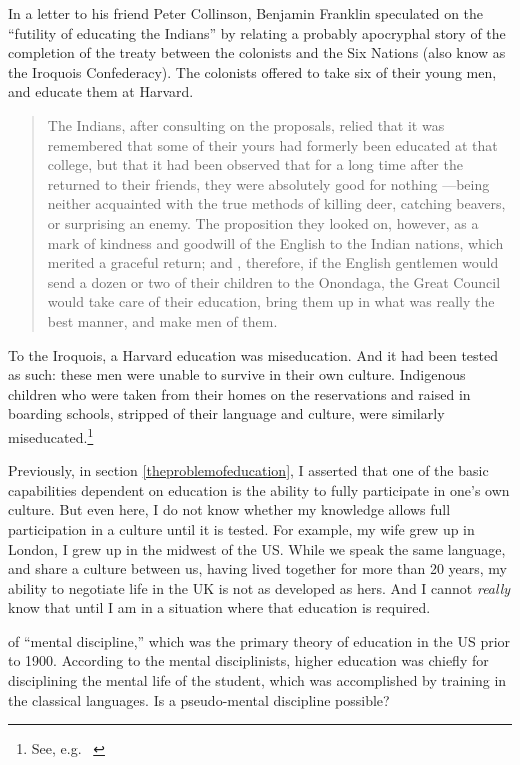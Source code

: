 In a letter to his friend Peter Collinson, Benjamin Franklin speculated on the ``futility of educating the Indians'' by relating a probably apocryphal story of the completion of the treaty between the colonists and the Six Nations (also know as the Iroquois Confederacy). The colonists offered to take six of their young men, and educate them at Harvard. 

\begin{quote}

The Indians, after consulting on the proposals, relied that it was remembered that some of their yours had formerly been educated at that college, but that it had been observed that for a long time after the returned to their friends, they were absolutely good for nothing ---being neither acquainted with the true methods of killing deer, catching beavers, or surprising an enemy. The proposition they looked on, however, as a mark of kindness and goodwill of the English to the Indian nations, which merited a graceful return; and , therefore, if the English gentlemen would send a dozen or two of their children to the Onondaga, the Great Council would take care of their education, bring them up in what was really the best manner, and make men of them. ~\citep[p. 498]{Franklin:1976ul}
\end{quote}

To the Iroquois, a Harvard education was miseducation. And it had been tested as such: these men were unable to survive in their own culture. Indigenous children who were taken from their homes on the reservations and raised in boarding schools, stripped of their language and culture, were similarly miseducated.\footnote{See, e.g. ~\citep{Child:1998tk}}

Previously, in section \ref{theproblemofeducation}, I asserted that one of the basic capabilities dependent on education is the ability to fully participate in one's own culture. But even here, I do not know whether my knowledge allows full participation in a culture until it is tested. For example, my wife grew up in London, I grew up in the midwest of the US. While we speak the same language, and share a culture between us, having lived together for more than 20 years, my ability to negotiate life in the UK is not as developed as hers. And I cannot \emph{really} know that until I am in a situation where that education is required.

 of ``mental discipline,'' which was the primary theory of education in the US prior to 1900. According to the mental disciplinists, higher education was chiefly for disciplining the mental life of the student, which was accomplished by training in the classical languages. Is a pseudo-mental discipline possible?

